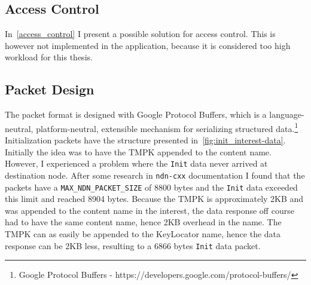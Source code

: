 \subsection{Access Control}
In~\autoref{access_control} I present a possible solution for access control.
This is however not implemented in the application, because it is considered too high workload for this thesis.

\subsection{Packet Design}
The packet format is designed with Google Protocol Buffers, which is a language-neutral, platform-neutral, extensible mechanism for serializing structured \gls{data}.\footnote{Google Protocol Buffers - https://developers.google.com/protocol-buffers/}
Initialization packets have the structure presented in~\autoref{fig:init_interest-data}.
Initially the idea was to have the \gls{TMPK} appended to the content \gls{name}. 
However, I experienced a problem where the \texttt{Init} \gls{data} never arrived at destination node. 
After some research in \texttt{ndn-cxx} documentation I found that the packets have a \texttt{MAX\_NDN\_PACKET\_SIZE} of 8800 bytes and the \texttt{Init} \gls{data} exceeded this limit and reached 8904 bytes.
Because the \gls{TMPK} is approximately 2\gls{KB} and was appended to the content \gls{name} in the \gls{interest}, the \gls{data} response off course had to have the same content \gls{name}, hence 2\gls{KB} overhead in the \gls{name}. 
The \gls{TMPK} can as easily be appended to the KeyLocator \gls{name}, hence the \gls{data} response can be 2\gls{KB} less, resulting to a 6866 bytes \texttt{Init} \gls{data} packet.

